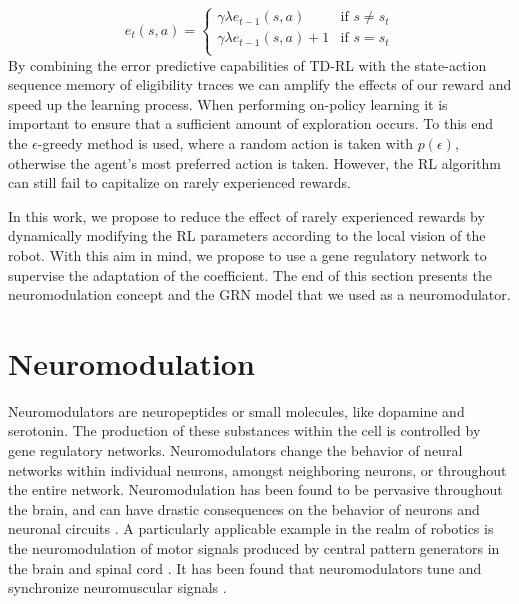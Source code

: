 \documentclass[conference]{IEEEtran}
\begin{document}
\begin{equation}
e_t(s,a) = 	\begin{cases}
			\gamma \lambda e_{t-1}(s,a) & \mbox{if } s \neq s_t \\ 
			\gamma \lambda e_{t-1}(s,a)+1 & \mbox{if }s = s_t \\
			\end{cases}
\end{equation} 
\noindent By combining the error predictive capabilities of TD-RL with the
state-action sequence memory of eligibility traces we can amplify the effects
of our reward and speed up the learning process. When performing on-policy
learning it is important to ensure that a sufficient amount of exploration
occurs. To this end the $\epsilon$-greedy method is used, where a random
action is taken with $p(\epsilon)$, otherwise the agent's most preferred 
action is taken. However, the RL algorithm can still fail to capitalize on rarely
experienced rewards. 

In this work, we propose to reduce the effect of rarely experienced rewards by
dynamically modifying the RL parameters according to the local vision of the
robot. With this aim in mind, we propose to use a gene regulatory network to
supervise the adaptation of the coefficient. The end of this section presents
the neuromodulation concept and the GRN model that we used as a neuromodulator.



%
\section{Neuromodulation}

Neuromodulators are neuropeptides or small molecules, like dopamine and
serotonin. The production of these substances within the cell is controlled by
gene regulatory networks. Neuromodulators change the behavior of neural networks
within individual neurons, amongst neighboring neurons, or throughout the entire
network. Neuromodulation has been found to be pervasive throughout the brain,
and can have drastic consequences on the behavior of neurons and neuronal
circuits \cite{Destexhe2004,Marder2012,Marder2002}. A particularly applicable
example in the realm of robotics is the neuromodulation of motor signals
produced by central pattern generators in the brain and spinal cord
\cite{Katz1995}. It has been found that neuromodulators tune and synchronize
neuromuscular signals \cite{Zhurov2006}.
\end{document}
